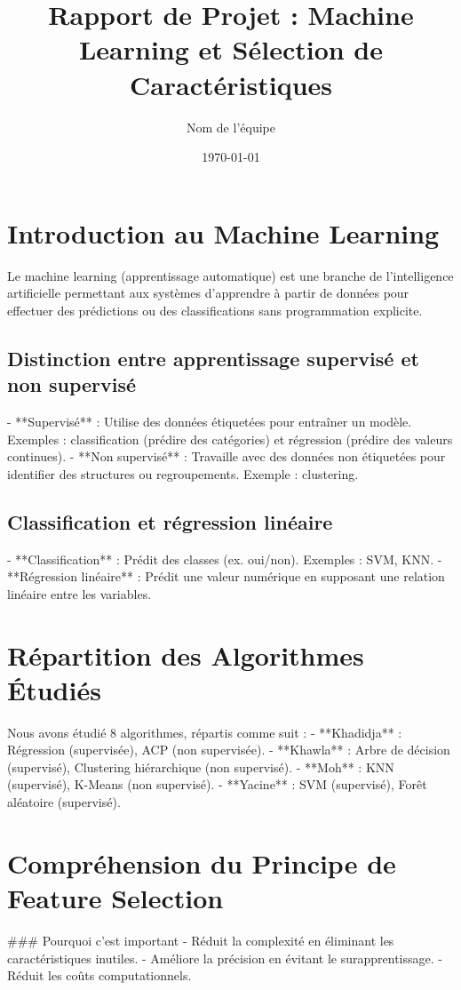 \documentclass{article}
\title{Rapport de Projet : Machine Learning et Sélection de Caractéristiques}
\author{Nom de l'équipe}
\date{\today}
\begin{document}
\maketitle

\section{Introduction au Machine Learning}
Le machine learning (apprentissage automatique) est une branche de l'intelligence artificielle permettant aux systèmes d'apprendre à partir de données pour effectuer des prédictions ou des classifications sans programmation explicite.

\subsection{Distinction entre apprentissage supervisé et non supervisé}
- **Supervisé** : Utilise des données étiquetées pour entraîner un modèle. Exemples : classification (prédire des catégories) et régression (prédire des valeurs continues).  
- **Non supervisé** : Travaille avec des données non étiquetées pour identifier des structures ou regroupements. Exemple : clustering.

\subsection{Classification et régression linéaire}
- **Classification** : Prédit des classes (ex. oui/non). Exemples : SVM, KNN.  
- **Régression linéaire** : Prédit une valeur numérique en supposant une relation linéaire entre les variables.

\section{Répartition des Algorithmes Étudiés}
Nous avons étudié 8 algorithmes, répartis comme suit :
- **Khadidja** : Régression (supervisée), ACP (non supervisée).  
- **Khawla** : Arbre de décision (supervisé), Clustering hiérarchique (non supervisé).  
- **Moh** : KNN (supervisé), K-Means (non supervisé).  
- **Yacine** : SVM (supervisé), Forêt aléatoire (supervisé).

\section{Compréhension du Principe de Feature Selection}
### Pourquoi c'est important
- Réduit la complexité en éliminant les caractéristiques inutiles.  
- Améliore la précision en évitant le surapprentissage.  
- Réduit les coûts computationnels.
\end{document}
